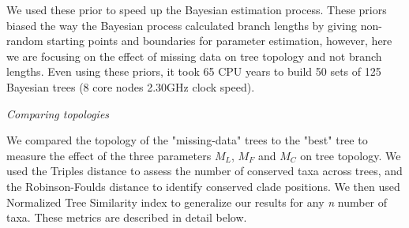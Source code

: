 \documentclass[12pt,letterpaper]{article}
\renewcommand{\subsection}[1]{%
\bigskip
\begin{center}
\begin{large}
\normalfont\itshape #1
\end{large}
\end{center}}
\begin{document}
We used these prior to speed up the Bayesian estimation process.
These priors biased the way the Bayesian process calculated branch lengths by giving non-random starting points and boundaries for parameter estimation, however, here we are focusing on the effect of missing data on tree topology and not branch lengths.
Even using these priors, it took 65 CPU years to build 50 sets of 125 Bayesian trees (8 core nodes 2.30GHz clock speed).


\subsection{Comparing topologies}
We compared the topology of the "missing-data" trees to the "best" tree to measure the effect of the three parameters $M_{L}$, $M_{F}$ and $M_{C}$ on tree topology.
We used the Triples distance \citep{dobson1975triplets} to assess the number of conserved taxa across trees, and the Robinson-Foulds distance \citep{RF1981} to identify conserved clade positions.
We then used Normalized Tree Similarity index \citep{Bogdanowicz2012} to generalize our results for any \textit{n} number of taxa.
These metrics are described in detail below.
\end{document}
